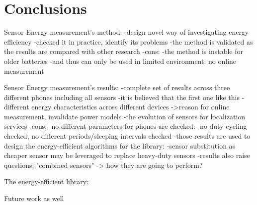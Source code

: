 \section{Conclusions}
\label{s:conc}


Sensor Energy measurement's method:
	-design novel way of investigating energy efficiency
	-checked it in practice, identify its problems
	-the method is validated as the results are compared with other research
	-cons:
		-the method is instable for older batteries 
			-and thus can only be used in limited environment: no online measurement
	
	
Sensor Energy measurement's results:
	-complete set of results across three different phones including all sensors
		-it is believed that the first one like this
	-different energy characteristics across different devices
		->reason for online measurement, invalidate power models
	-the evolution of sensors for localization services
	-cons:
		-no different parameters for phones are checked:
			-no duty cycling checked, no different periods/sleeping intervals checked
	-those results are used to design the energy-efficient algorithms for the library:
		-sensor substitution as cheaper sensor may be leveraged to replace heavy-duty sensors
		-results also raise questions: "combined sensors" -> how they are going to perform?
	
The energy-efficient library:






Future work as well